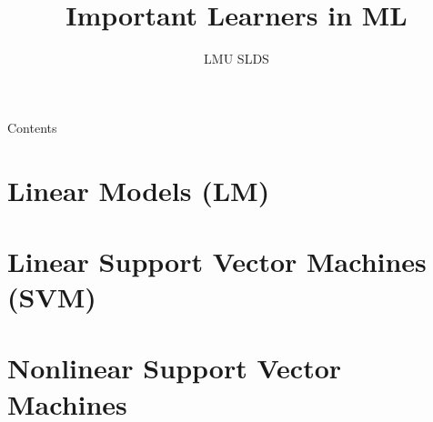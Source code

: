 






\title{Important Learners in ML}
\author{LMU SLDS}
\date{}

\newcommand{\titlefigure}{figure_man/waveform}
\newcommand{\titlefiguresize}{1}
\newcommand{\titlefiguresource}{https://www.keysight.com/}
\newcommand{\learninggoals}{
  \item Understand general idea of most important ML algorithms
  \item Learn to choose best-suited algorithm by weighing strengths and 
  weaknesses
  \item Apply algorithms more effectively
}




\lecturechapter{}

\begin{frame}{Contents}
  \tableofcontents
\end{frame}

\footnotesize

\setdraft

\section{Linear Models (LM)}


% 

\section{Linear Support Vector Machines (SVM)}


\section{Nonlinear Support Vector Machines}


